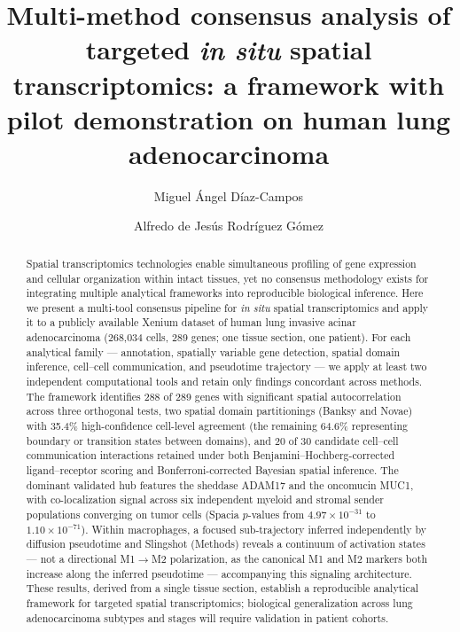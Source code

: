 \documentclass[12pt,a4paper]{article}
\title{\textbf{Multi-method consensus analysis of targeted \textit{in situ} spatial transcriptomics: a framework with pilot demonstration on human lung adenocarcinoma}}
\author[1]{Miguel \'{A}ngel D\'{i}az-Campos}
\author[1,$\dagger$]{Alfredo de Jes\'{u}s Rodr\'{i}guez G\'{o}mez}
\affil[1]{Instituto Nacional de Pediatr\'{i}a (INP), M\'{e}xico City, M\'{e}xico}
\affil[$\dagger$]{Corresponding author: \href{mailto:alfredo.rodriguez@iibiomedicas.unam.mx}{alfredo.rodriguez@iibiomedicas.unam.mx}}
\date{}
\begin{document}
\maketitle

\begin{abstract}
Spatial transcriptomics technologies enable simultaneous profiling of gene expression and cellular organization within intact tissues, yet no consensus methodology exists for integrating multiple analytical frameworks into reproducible biological inference. Here we present a multi-tool consensus pipeline for \textit{in situ} spatial transcriptomics and apply it to a publicly available Xenium dataset of human lung invasive acinar adenocarcinoma (268,034 cells, 289 genes; one tissue section, one patient). For each analytical family --- annotation, spatially variable gene detection, spatial domain inference, cell--cell communication, and pseudotime trajectory --- we apply at least two independent computational tools and retain only findings concordant across methods. The framework identifies 288 of 289 genes with significant spatial autocorrelation across three orthogonal tests, two spatial domain partitionings (Banksy and Novae) with 35.4\% high-confidence cell-level agreement (the remaining 64.6\% representing boundary or transition states between domains), and 20 of 30 candidate cell--cell communication interactions retained under both Benjamini--Hochberg-corrected ligand--receptor scoring and Bonferroni-corrected Bayesian spatial inference. The dominant validated hub features the sheddase ADAM17 and the oncomucin MUC1, with co-localization signal across six independent myeloid and stromal sender populations converging on tumor cells (Spacia $p$-values from $4.97 \times 10^{-31}$ to $1.10 \times 10^{-71}$). Within macrophages, a focused sub-trajectory inferred independently by diffusion pseudotime and Slingshot (Methods) reveals a continuum of activation states --- not a directional M1$\to$M2 polarization, as the canonical M1 and M2 markers both increase along the inferred pseudotime --- accompanying this signaling architecture. These results, derived from a single tissue section, establish a reproducible analytical framework for targeted spatial transcriptomics; biological generalization across lung adenocarcinoma subtypes and stages will require validation in patient cohorts.
\end{abstract}

\tableofcontents
\newpage
\end{document}
